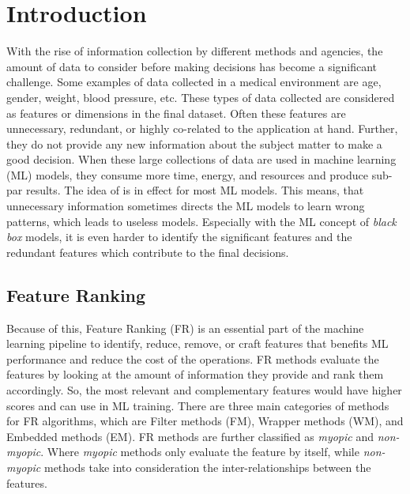 \documentclass[11pt]{article}
\begin{document}





\newpage
\section{Introduction}
With the rise of information collection by different methods and agencies, the amount of data to consider before making decisions has become a significant challenge. Some examples of data collected in a medical environment are age, gender, weight, blood pressure, etc. These types of data collected are considered as features or dimensions in the final dataset. Often these features are unnecessary, redundant, or highly co-related to the application at hand. Further, they do not provide any new information about the subject matter to make a good decision. When these large collections of data are used in machine learning (ML) models, they consume more time, energy, and resources and produce sub-par results. The idea of  is in effect for most ML models. This means, that unnecessary information sometimes directs the ML models to learn wrong patterns, which leads to useless models.  Especially with the ML concept of \textit{black box} models, it is even harder to identify the significant features and the redundant features which contribute to the final decisions.

\subsection{Feature Ranking}

Because of this, Feature Ranking (FR) is an essential part of the machine learning pipeline to identify, reduce, remove, or craft features that benefits ML performance and reduce the cost of the operations. FR methods evaluate the features by looking at the amount of information they provide and rank them accordingly. So, the most relevant and complementary features would have higher scores and can use in ML training. There are three main categories of methods for FR algorithms, which are Filter methods (FM), Wrapper methods (WM), and Embedded methods (EM). FR methods are further classified as {\it myopic} and {\it non-myopic}. Where {\it myopic} methods only evaluate the feature by itself, while {\it non-myopic} methods take into consideration the inter-relationships between the features.
\end{document}
